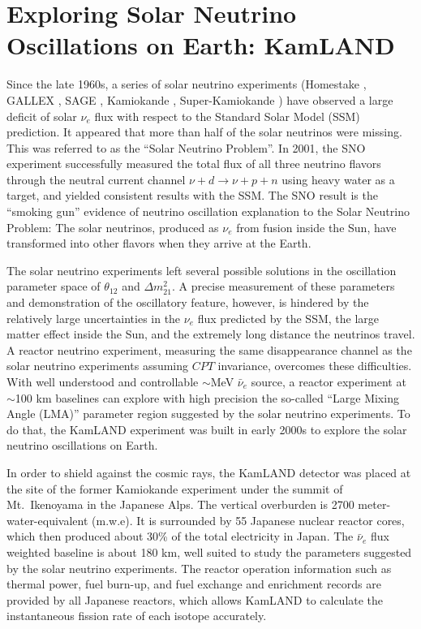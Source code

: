 \section{Exploring Solar Neutrino Oscillations on Earth: KamLAND} 
\label{sec:kamland}

Since the late 1960s, a series of solar neutrino experiments (Homestake \cite{Homestake}, GALLEX \cite{GALLEX}, SAGE \cite{SAGE}, Kamiokande \cite{Kamiokande}, Super-Kamiokande \cite{Super-Kamiokande}) have observed a large deficit of solar $\nu_e$ flux with respect to the Standard Solar Model (SSM) \cite{Bahcall} prediction. It appeared that more than half of the solar neutrinos were missing. This was referred to as the ``Solar Neutrino Problem''. In 2001, the SNO experiment \cite{SNO} successfully measured the total flux of all three neutrino flavors through the neutral current channel $\nu + d \to \nu + p + n$ using heavy water as a target, and yielded consistent results with the SSM. The SNO result is the ``smoking gun'' evidence of neutrino oscillation explanation to the Solar Neutrino Problem: The solar neutrinos, produced as $\nu_e$ from fusion inside the Sun, have transformed into other flavors when they arrive at the Earth.

The solar neutrino experiments left several possible solutions in the oscillation parameter space of $\theta_{12}$ and $\Delta m^2_{21}$. 
A precise measurement of these parameters and demonstration of the oscillatory feature, however, is hindered by the relatively large uncertainties in the $\nu_{e}$ flux predicted by the SSM, the large matter effect inside the Sun, and the extremely long distance the neutrinos travel. 
A reactor neutrino experiment, measuring the same disappearance channel as the solar neutrino experiments assuming $CPT$ invariance, overcomes these difficulties. 
With well understood and controllable $\sim$MeV $\bar\nu_e$ source, a reactor experiment at $\sim$100 km baselines can explore with high precision the so-called ``Large Mixing Angle (LMA)'' parameter region suggested by the solar neutrino experiments. To do that, the KamLAND experiment \cite{Kamland03} was built in early 2000s to explore the solar neutrino oscillations on Earth.

In order to shield against the cosmic rays, the KamLAND detector was placed at the site of the former Kamiokande experiment \cite{Kamiokande} under the summit of Mt.~Ikenoyama in the Japanese Alps. The vertical overburden is 2700 meter-water-equivalent (m.w.e). It is surrounded by 55 Japanese nuclear reactor cores, which then produced about 30\% of the total electricity in Japan. The $\bar\nu_e$ flux weighted baseline is about 180 km, well suited to study the parameters suggested by the solar neutrino experiments. The reactor operation information such as thermal power, fuel burn-up, and fuel exchange and enrichment records are provided by all Japanese reactors, which allows KamLAND to calculate the instantaneous fission rate of each isotope accurately. 

